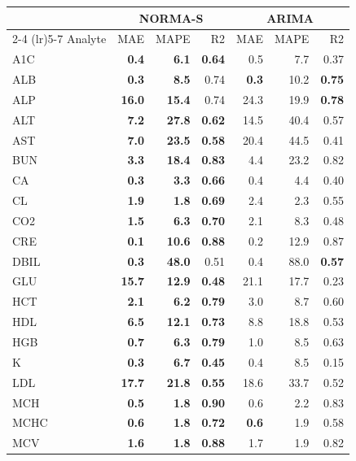 \begin{table}[ht]
\centering
\footnotesize
\begin{tabular}{lrrrrrr}
\toprule
  & \multicolumn{3}{c}{NORMA-S} & \multicolumn{3}{c}{ARIMA} \\
\cmidrule(lr){2-4} \cmidrule(lr){5-7}
Analyte & MAE & MAPE & R2 & MAE & MAPE & R2 \\
\midrule
A1C & \textbf{0.4} & \textbf{6.1} & \textbf{0.64} & 0.5 & 7.7 & 0.37 \\
ALB & \textbf{0.3} & \textbf{8.5} & 0.74 & \textbf{0.3} & 10.2 & \textbf{0.75} \\
ALP & \textbf{16.0} & \textbf{15.4} & 0.74 & 24.3 & 19.9 & \textbf{0.78} \\
ALT & \textbf{7.2} & \textbf{27.8} & \textbf{0.62} & 14.5 & 40.4 & 0.57 \\
AST & \textbf{7.0} & \textbf{23.5} & \textbf{0.58} & 20.4 & 44.5 & 0.41 \\
BUN & \textbf{3.3} & \textbf{18.4} & \textbf{0.83} & 4.4 & 23.2 & 0.82 \\
CA & \textbf{0.3} & \textbf{3.3} & \textbf{0.66} & 0.4 & 4.4 & 0.40 \\
CL & \textbf{1.9} & \textbf{1.8} & \textbf{0.69} & 2.4 & 2.3 & 0.55 \\
CO2 & \textbf{1.5} & \textbf{6.3} & \textbf{0.70} & 2.1 & 8.3 & 0.48 \\
CRE & \textbf{0.1} & \textbf{10.6} & \textbf{0.88} & 0.2 & 12.9 & 0.87 \\
DBIL & \textbf{0.3} & \textbf{48.0} & 0.51 & 0.4 & 88.0 & \textbf{0.57} \\
GLU & \textbf{15.7} & \textbf{12.9} & \textbf{0.48} & 21.1 & 17.7 & 0.23 \\
HCT & \textbf{2.1} & \textbf{6.2} & \textbf{0.79} & 3.0 & 8.7 & 0.60 \\
HDL & \textbf{6.5} & \textbf{12.1} & \textbf{0.73} & 8.8 & 18.8 & 0.53 \\
HGB & \textbf{0.7} & \textbf{6.3} & \textbf{0.79} & 1.0 & 8.5 & 0.63 \\
K & \textbf{0.3} & \textbf{6.7} & \textbf{0.45} & 0.4 & 8.5 & 0.15 \\
LDL & \textbf{17.7} & \textbf{21.8} & \textbf{0.55} & 18.6 & 33.7 & 0.52 \\
MCH & \textbf{0.5} & \textbf{1.8} & \textbf{0.90} & 0.6 & 2.2 & 0.83 \\
MCHC & \textbf{0.6} & \textbf{1.8} & \textbf{0.72} & \textbf{0.6} & 1.9 & 0.58 \\
MCV & \textbf{1.6} & \textbf{1.8} & \textbf{0.88} & 1.7 & 1.9 & 0.82 \\

\end{tabular}
\end{table}

